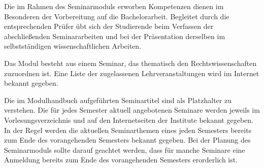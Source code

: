 \begin{module}
\begin{learningoutcomes}
Die im Rahmen des Seminarmoduls erworben Kompetenzen dienen im Besonderen der Vorbereitung auf die Bachelorarbeit. Begleitet durch die entsprechenden Prüfer übt sich der Studierende beim Verfassen der abschließenden Seminararbeiten und bei der Präsentation derselben im selbstständigen wissenschaftlichen Arbeiten.


\end{learningoutcomes}

\begin{content}
Das Modul besteht aus einem Seminar, das thematisch den Rechtswissenschaften zuzuordnen ist. Eine Liste der zugelassenen Lehrveranstaltungen wird im Internet bekannt gegeben.


\end{content}

\begin{remarks}Die im Modulhandbuch aufgeführten Seminartitel sind als Platzhalter zu verstehen. Die für jedes Semester aktuell angebotenen Seminare werden jeweils im Vorlesungsverzeichnis und auf den Internetseiten der Institute bekannt gegeben. In der Regel werden die aktuellen Seminarthemen eines jeden Semesters bereits zum Ende des vorangehenden Semesters bekannt gegeben. Bei der Planung des Seminarmoduls sollte darauf geachtet werden, dass für manche Seminare eine Anmeldung bereits zum Ende des vorangehenden Semesters erorderlich ist.

\end{remarks}

\end{module}

